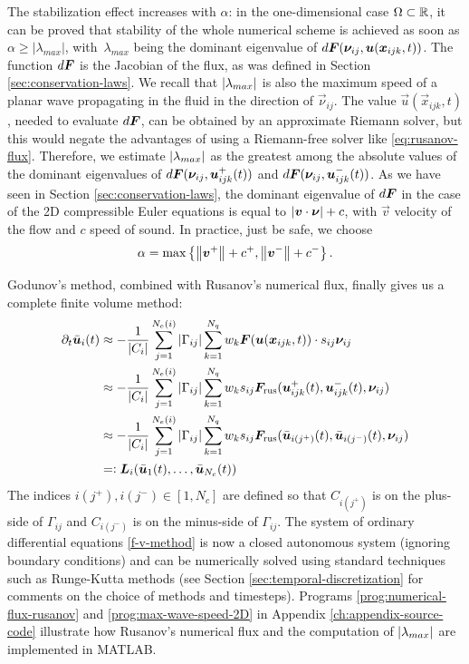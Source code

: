 The stabilization effect increases with $\alpha$: in the one-dimensional case
$\Omega \subset \mathbb{R}$, it can be proved that stability of the whole numerical
scheme is achieved as soon as $\alpha\geq\left|\lambda_{max}\right|$,
with~$\lambda_{max}$ being the dominant eigenvalue of
$d\bm{F}(\bm{\nu}_{ij},\bm{u}(\bm{x}_{ijk},t))$.
The function $d\bm{F}$ is the Jacobian of the flux, as was defined in
Section \ref{sec:conservation-laws}.
We recall that $\left\lvert\lambda_{max}\right\rvert$ is also the maximum speed of a planar wave
propagating in the fluid in the direction of $\vec{\nu}_{ij}$.
The value $\vec{u}(\vec{x}_{ijk},t)$, needed to evaluate $d\bm{F}$,
can be obtained by an approximate Riemann solver, but this would negate
the advantages of using a Riemann-free solver like \eqref{eq:rusanov-flux}.
Therefore, we estimate $\left\lvert\lambda_{max}\right\rvert$ as the greatest among the absolute
values of the dominant eigenvalues of $d\bm{F}(\bm{\nu}_{ij},\bm{u}_{ijk}^{+}(t))$
and $d\bm{F}(\bm{\nu}_{ij},\bm{u}_{ijk}^{-}(t))$.
As we have seen in Section \ref{sec:conservation-laws},
the dominant eigenvalue of $d\bm{F}$ in the case of the 2D
compressible Euler equations is equal to
$\left\lvert\bm{v} \cdot \bm{\nu}\right\rvert+c$,
with $\vec{v}$ velocity of the flow and $c$ speed of sound.
In practice, just be safe, we choose
\[
\alpha = \max \left\{
\left\lVert\bm{v}^{+}\right\rVert+c^{+}, \left\lVert\bm{v}^{-}\right\rVert+c^{-}
\right\}.
\]

Godunov's method, combined with Rusanov's numerical flux,
finally gives us a complete finite volume method:
\begin{equation} \label{f-v-method}
\begin{aligned}
\partial_{t}\bar{\bm{u}}_{i}(t)
&\approx -\dfrac{1}{\left|C_{i}\right|}\sum_{j=1}^{N_{e}(i)}\left|\Gamma_{ij}
	\right|\sum_{k=1}^{N_{q}}
	w_k \bm{F}(\bm{u}(\bm{x}_{ijk},t))\cdot s_{ij}\bm{\nu}_{ij} \\
&\approx -\dfrac{1}{\left|C_{i}\right|}\sum_{j=1}^{N_{e}(i)}\left|\Gamma_{ij}
	\right|\sum_{k=1}^{N_{q}} w_{k} s_{ij}
	\bm{F}_\text{rus}(\bm{u}_{ijk}^{+}(t),\bm{u}^{-}_{ijk}(t),\bm{\nu}_{ij}) \\
&\approx -\dfrac{1}{\left|C_{i}\right|}\sum_{j=1}^{N_{e}(i)}\left|\Gamma_{ij}
	\right|\sum_{k=1}^{N_{q}} w_{k} s_{ij} 
	\bm{F}_\text{rus}(\bar{\bm{u}}_{i(j^+)}(t),	
	                   \bar{\bm{u}}_{i(j^-)}(t),\bm{\nu}_{ij}) \\
&=\vcentcolon \bm{L}_i(\bar{\bm{u}}_1(t), \dots, \bar{\bm{u}}_{N_c}(t))
\end{aligned}
\end{equation}
The indices $i(j^+),i(j^-)\in[1,N_{c}]$ are defined so that $C_{i(j^+)}$
is on the plus-side of $\Gamma_{ij}$ and $C_{i(j^-)}$ is on the minus-side
of $\Gamma_{ij}$.
The system of ordinary differential equations \eqref{f-v-method}
is now a closed autonomous system (ignoring boundary conditions)
and can be numerically solved using standard techniques
such as Runge-Kutta methods (see Section \ref{sec:temporal-discretization}
for comments on the choice of methods and timesteps).
Programs \ref{prog:numerical-flux-rusanov} and \ref{prog:max-wave-speed-2D}
in Appendix \ref{ch:appendix-source-code} illustrate how Rusanov's numerical
flux and the computation of $\left\lvert\lambda_{max}\right\rvert$ are implemented in MATLAB.


